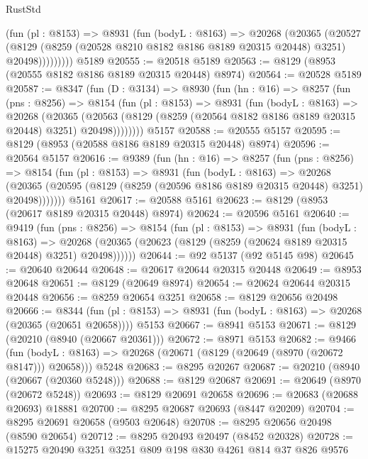 \begin{lexlean}{RustStd}
\begin{coremodule}
            (fun (pl : @8153) =>
            @8931
              (fun (bodyL : @8163) =>
              @20268
                (@20365
                  (@20527
                    (@8129
                      (@8259 (@20528 @8210 @8182 @8186 @8189 @20315 @20448) @3251)
                      @20498)))))))))
    @5189
@20555 := @20518 @5189
@20563 := @8129 (@8953 (@20555 @8182 @8186 @8189 @20315 @20448) @8974)
@20564 := @20528 @5189
@20587 := @8347
    (fun (D : @3134) =>
    @8930
      (fun (hn : @16) =>
      @8257
        (fun (pns : @8256) =>
        @8154
          (fun (pl : @8153) =>
          @8931
            (fun (bodyL : @8163) =>
            @20268
              (@20365
                (@20563 (@8129 (@8259 (@20564 @8182 @8186 @8189 @20315 @20448) @3251) @20498))))))))
    @5157
@20588 := @20555 @5157
@20595 := @8129 (@8953 (@20588 @8186 @8189 @20315 @20448) @8974)
@20596 := @20564 @5157
@20616 := @9389
    (fun (hn : @16) =>
    @8257
      (fun (pns : @8256) =>
      @8154
        (fun (pl : @8153) =>
        @8931
          (fun (bodyL : @8163) =>
          @20268
            (@20365 (@20595 (@8129 (@8259 (@20596 @8186 @8189 @20315 @20448) @3251) @20498)))))))
    @5161
@20617 := @20588 @5161
@20623 := @8129 (@8953 (@20617 @8189 @20315 @20448) @8974)
@20624 := @20596 @5161
@20640 := @9419
    (fun (pns : @8256) =>
    @8154
      (fun (pl : @8153) =>
      @8931
        (fun (bodyL : @8163) =>
        @20268 (@20365 (@20623 (@8129 (@8259 (@20624 @8189 @20315 @20448) @3251) @20498))))))
@20644 := @92 @5137 (@92 @5145 @98)
@20645 := @20640 @20644
@20648 := @20617 @20644 @20315 @20448
@20649 := @8953 @20648
@20651 := @8129 (@20649 @8974)
@20654 := @20624 @20644 @20315 @20448
@20656 := @8259 @20654 @3251
@20658 := @8129 @20656 @20498
@20666 := @8344
    (fun (pl : @8153) => @8931 (fun (bodyL : @8163) => @20268 (@20365 (@20651 @20658))))
    @5153
@20667 := @8941 @5153
@20671 := @8129 (@20210 (@8940 (@20667 @20361)))
@20672 := @8971 @5153
@20682 := @9466
    (fun (bodyL : @8163) => @20268 (@20671 (@8129 (@20649 (@8970 (@20672 @8147))) @20658)))
    @5248
@20683 := @8295 @20267
@20687 := @20210 (@8940 (@20667 (@20360 @5248)))
@20688 := @8129 @20687
@20691 := @20649 (@8970 (@20672 @5248))
@20693 := @8129 @20691 @20658
@20696 := @20683 (@20688 @20693) @18881
@20700 := @8295 @20687 @20693 (@8447 @20209)
@20704 := @8295 @20691 @20658 (@9503 @20648)
@20708 := @8295 @20656 @20498 (@8590 @20654)
@20712 := @8295 @20493 @20497 (@8452 @20328)
@20728 := @15275
    @20490
    @3251
    @3251
    @809
    @198
    @830
    @4261
    @814
    @37
    @826
    @9576

\end{coremodule}
\end{lexlean}
